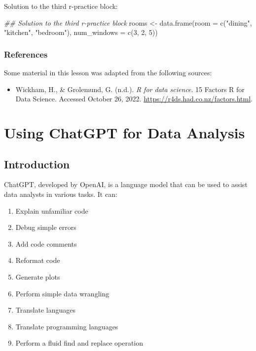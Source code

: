\documentclass[
  letterpaper,
  DIV=11,
  numbers=noendperiod]{scrreprt}
\newenvironment{Shaded}{\begin{snugshade}}{\end{snugshade}}
\newcommand{\AttributeTok}[1]{\textcolor[rgb]{0.40,0.45,0.13}{#1}}
\newcommand{\DecValTok}[1]{\textcolor[rgb]{0.68,0.00,0.00}{#1}}
\newcommand{\DocumentationTok}[1]{\textcolor[rgb]{0.37,0.37,0.37}{\textit{#1}}}
\newcommand{\FunctionTok}[1]{\textcolor[rgb]{0.28,0.35,0.67}{#1}}
\newcommand{\NormalTok}[1]{\textcolor[rgb]{0.00,0.23,0.31}{#1}}
\newcommand{\OtherTok}[1]{\textcolor[rgb]{0.00,0.23,0.31}{#1}}
\newcommand{\StringTok}[1]{\textcolor[rgb]{0.13,0.47,0.30}{#1}}
\providecommand{\tightlist}{%
  \setlength{\itemsep}{0pt}\setlength{\parskip}{0pt}}\usepackage{longtable,booktabs,array}
\begin{document}
Solution to the third r-practice block:

\begin{Shaded}
\begin{Highlighting}[]
\DocumentationTok{\#\# Solution to the third r{-}practice block}
\NormalTok{rooms }\OtherTok{\textless{}{-}} \FunctionTok{data.frame}\NormalTok{(}\AttributeTok{room =} \FunctionTok{c}\NormalTok{(}\StringTok{"dining"}\NormalTok{, }\StringTok{"kitchen"}\NormalTok{, }\StringTok{"bedroom"}\NormalTok{), }
                    \AttributeTok{num\_windows =} \FunctionTok{c}\NormalTok{(}\DecValTok{3}\NormalTok{, }\DecValTok{2}\NormalTok{, }\DecValTok{5}\NormalTok{))}
\end{Highlighting}
\end{Shaded}

\subsection*{References}\label{references-5}

Some material in this lesson was adapted from the following sources:

\begin{itemize}
\tightlist
\item
  Wickham, H., \& Grolemund, G. (n.d.). \emph{R for data science}. 15
  Factors \textbar{} R for Data Science. Accessed October 26, 2022.
  \url{https://r4ds.had.co.nz/factors.html}.
\end{itemize}

\chapter{Using ChatGPT for Data
Analysis}\label{using-chatgpt-for-data-analysis}

\section{Introduction}\label{introduction-7}

ChatGPT, developed by OpenAI, is a language model that can be used to
assist data analysts in various tasks. It can:

\begin{enumerate}
\def\labelenumi{\arabic{enumi}.}
\tightlist
\item
  Explain unfamiliar code
\item
  Debug simple errors
\item
  Add code comments
\item
  Reformat code
\item
  Generate plots
\item
  Perform simple data wrangling
\item
  Translate languages
\item
  Translate programming languages
\item
  Perform a fluid find and replace operation
\end{enumerate}
\end{document}
